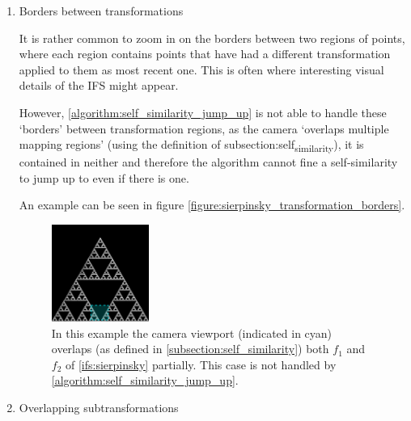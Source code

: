 \documentclass[11pt]{article}
\begin{document}
\begin{enumerate}
\item Borders between transformations
\label{sec:org37b3a8a}

It is rather common to zoom in on the borders between two regions of points, where each region contains points that have had a different transformation applied to them as most recent one. 
This is often where interesting visual details of the IFS might appear.

However, \autoref{algorithm:self_similarity_jump_up} is not able to handle these `borders' between transformation regions,
as the camera `overlaps multiple mapping regions' (using the definition of subsection:self\textsubscript{similarity}),
it is contained in neither and therefore the algorithm cannot fine a self-similarity to jump up to even if there is one.

An example can be seen in figure \autoref{figure:sierpinsky_transformation_borders}.

\begin{figure}
\centering
\includegraphics[width=0.3\textwidth]{figures/sierpinsky_transformation_borders}
\caption{In this example the camera viewport (indicated in cyan) overlaps (as defined in \autoref{subsection:self_similarity}) both $f_1$ and $f_2$ of \autoref{ifs:sierpinsky} partially. This case is not handled by \autoref{algorithm:self_similarity_jump_up}. }
\label{figure:sierpinsky_transformation_borders}
\end{figure}

\item Overlapping subtransformations
\label{sec:org498caf1}


\end{enumerate}
\end{document}
